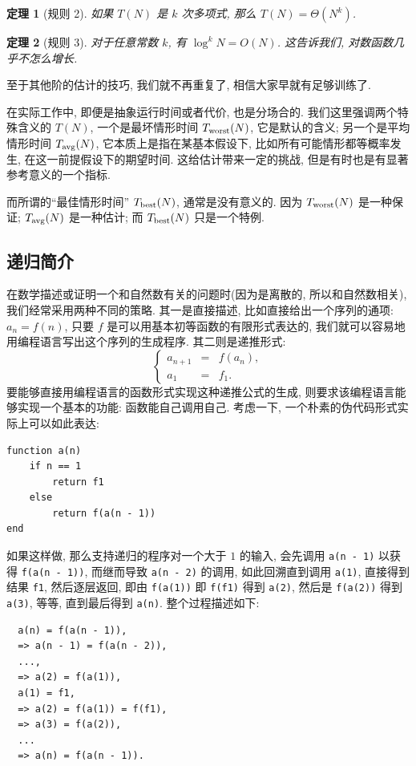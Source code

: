 \documentclass[a4paper]{ctexart}
\newtheorem{theorem}{定理}
\theoremstyle{definition}
\theoremstyle{definition}
\begin{document}
\begin{theorem}[规则 2]
如果 $T(N)$ 是 $k$ 次多项式, 那么 $T(N) = \Theta(N^k)$.  
\end{theorem}

\begin{theorem}[规则 3]
对于任意常数 $k$, 有 $\log^k N = O(N)$.
这告诉我们, 对数函数几乎不怎么增长.
\end{theorem}

至于其他阶的估计的技巧, 我们就不再重复了, 相信大家早就有足够训练了.

在实际工作中, 即便是抽象运行时间或者代价, 也是分场合的. 我们这里强调两个特殊含义的 $T(N)$,
一个是最坏情形时间 $T_{\rm worst} (N)$, 它是默认的含义;
另一个是平均情形时间 $T_{\rm avg}(N)$, 它本质上是指在某基本假设下,
比如所有可能情形都等概率发生, 在这一前提假设下的期望时间. 这给估计带来一定的挑战,
但是有时也是有显著参考意义的一个指标.

而所谓的``最佳情形时间'' $T_{\rm best}(N)$, 通常是没有意义的.
因为 $T_{\rm worst} (N)$ 是一种保证; $T_{\rm avg} (N)$ 是一种估计; 而
$T_{\rm best}(N)$ 只是一个特例.

\subsection{递归简介}

在数学描述或证明一个和自然数有关的问题时(因为是离散的, 所以和自然数相关),
我们经常采用两种不同的策略. 其一是直接描述,
比如直接给出一个序列的通项: $a_n = f(n)$, 只要 $f$
是可以用基本初等函数的有限形式表达的, 我们就可以容易地用编程语言写出这个序列的生成程序.
其二则是递推形式:
\begin{equation}
  \left\{
  \begin{array}{rcl}
    a_{n + 1} &=& f(a_n), \\
    a_1 &=& f_1. 
  \end{array}\right.
  \label{eq::recursion_formula}
\end{equation}
要能够直接用编程语言的函数形式实现这种递推公式的生成,
则要求该编程语言能够实现一个基本的功能: 函数能自己调用自己.
考虑一下, 一个朴素的伪代码形式实际上可以如此表达:
\begin{verbatim}
function a(n)
    if n == 1
        return f1
    else
        return f(a(n - 1))
end
\end{verbatim}
如果这样做, 那么支持递归的程序对一个大于 $1$ 的输入, 会先调用
\verb|a(n - 1)| 以获得 \verb|f(a(n - 1))|, 而继而导致 \verb|a(n - 2)|
的调用, 如此回溯直到调用 \verb|a(1)|, 直接得到结果 \verb|f1|, 然后逐层返回, 即由
\verb|f(a(1))| 即 \verb|f(f1)| 得到 \verb|a(2)|, 然后是 \verb|f(a(2))| 得到
\verb|a(3)|, 等等, 直到最后得到 \verb|a(n)|. 整个过程描述如下:
\begin{verbatim}
  a(n) = f(a(n - 1)),
  => a(n - 1) = f(a(n - 2)),
  ...,
  => a(2) = f(a(1)),
  a(1) = f1,
  => a(2) = f(a(1)) = f(f1),
  => a(3) = f(a(2)),
  ...
  => a(n) = f(a(n - 1)).
\end{verbatim}
\end{document}
